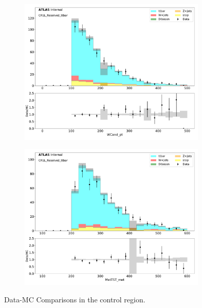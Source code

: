 \begin{figure}[htbp]
\begin{subfigure}{0.49\textwidth}
     \includegraphics[width = 0.98\textwidth]{Figures/4/datamc/CR1L_Resolved_ttbar/WCand_pt.pdf}
     \caption{\Wcandpt}
     \end{subfigure}
     \begin{subfigure}{0.49\textwidth}
     \includegraphics[width = 0.98\textwidth]{Figures/4/datamc/CR1L_Resolved_ttbar/MetTST_met.pdf}
     \caption{\met}
     \end{subfigure}

\caption{Data-MC Comparisons in the \resolved \ttbar control region.}
\label{fig:Data_MC_CRbV_resolved}
\end{figure}
\FloatBarrier
